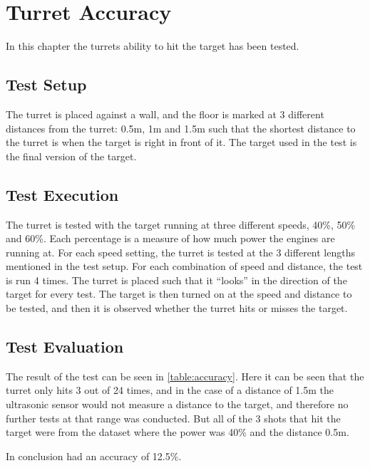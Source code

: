 \chapter{Turret Accuracy}\label{TurretAcc}
In this chapter the turrets ability to hit the target has been tested.

\section{Test Setup}
The turret is placed against a wall, and the floor is marked at 3 different
distances from the turret: 0.5m, 1m and 1.5m such that the shortest distance to
the turret is when the target is right in front of it. The target used
in the test is the final version of the target.

\section{Test Execution}
The turret is tested with the target running at three different speeds,
40\%, 50\% and 60\%. Each percentage is a measure of how much power the engines
are running at. For each speed setting, the turret is tested at the 3 different
lengths mentioned in the test setup. For each combination of speed and distance,
the test is run 4 times. The turret is placed such that it ``looks'' in the direction of
the target for every test. The target is then turned on at the speed and distance to be tested,
and then it is observed whether the turret hits or misses the target.

\section{Test Evaluation}
The result of the test can be seen in \autoref{table:accuracy}. Here it can be
seen that the turret only hits 3 out of 24 times, and in the
case of a distance of 1.5m the ultrasonic sensor would not measure a distance to
the target, and therefore no further tests at that range was conducted. But all
of the 3 shots that hit the target were from the dataset where the power was
40\% and the distance 0.5m. 


In conclusion \name had an accuracy of 12.5\%.

